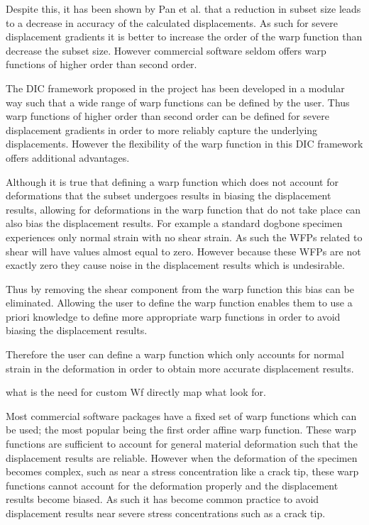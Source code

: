 \documentclass[12pt,oneside,openany,a4paper, %
english, %
masters-t, goldenblock]{usthesis}
\begin{document}
Despite this, it has been shown by Pan et al. \cite{pan2008study} that a reduction in subset size leads to a decrease in accuracy of the calculated displacements. As such for severe displacement gradients it is better to increase the order of the warp function than decrease the subset size. However commercial software seldom offers warp functions of higher order than second order. 

The DIC framework proposed in the project has been developed in a modular way such that a wide range of warp functions can be defined by the user. Thus warp functions of higher order than second order can be defined for severe displacement gradients in order to more reliably capture the underlying displacements. However the flexibility of the warp function in this DIC framework offers additional advantages.

Although it is true that defining a warp function which does not account for deformations that the subset undergoes results in biasing the displacement results, allowing for deformations in the warp function that do not take place can also bias the displacement results. For example a standard dogbone specimen experiences only normal strain with no shear strain. As such the WFPs related to shear will have values almost equal to zero. However because these WFPs are not exactly zero they cause noise in the displacement results which is undesirable. 

Thus by removing the shear component from the warp function this bias can be eliminated. Allowing the user to define the warp function enables them to use a priori knowledge to define more appropriate warp functions in order to avoid biasing the displacement results. 

Therefore the user can define a warp function which only accounts for normal strain in the deformation in order to obtain more accurate displacement results. 


what is the need for custom Wf
directly map what look for.



Most commercial software packages have a fixed set of warp functions which can be used; the most popular being the first order affine warp function. These warp functions are sufficient to account for general material deformation such that the displacement results are reliable. However when the deformation of the specimen becomes complex, such as near a stress concentration like a crack tip, these warp functions cannot account for the deformation properly and the displacement results become biased. As such it has become common practice to avoid displacement results near severe stress concentrations such as a crack tip.
\end{document}
